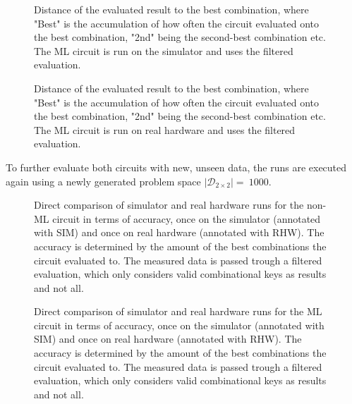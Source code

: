 \begin{figure}[!h]
    \centering
    \scalebox{\resultboxplot}{
        
    }
    \caption{Distance of the evaluated result to the best combination, where "Best" is the accumulation of how often the circuit evaluated onto the best combination, "2nd" being the second-best combination etc. The ML circuit is run on the simulator and uses the filtered evaluation.}
    \label{figure:ml_sim_distance}
\end{figure}



\begin{figure}[!h]
    \centering
    \scalebox{\resultboxplot}{
        
    }
    \caption{Distance of the evaluated result to the best combination, where "Best" is the accumulation of how often the circuit evaluated onto the best combination, "2nd" being the second-best combination etc. The ML circuit is run on real hardware and uses the filtered evaluation.}
    \label{figure:ml_rhw_dist}
\end{figure}

\clearpage

To further evaluate both circuits with new, unseen data, the runs are executed again using a newly generated problem space $\left|\mathcal{D}_{2\times2}\right| =\ 1000$.

\begin{figure}[!h]
    \centering
    \scalebox{\resultboxplot}{
        
    }
    \caption{Direct comparison of simulator and real hardware runs for the non-ML circuit in terms of accuracy, once on the simulator (annotated with SIM) and once on real hardware (annotated with RHW). The accuracy is determined by the amount of the best combinations the circuit evaluated to. The measured data is passed trough a filtered evaluation, which only considers valid combinational keys as results and not all.}
    \label{figure:blind_run_noml_circuit_acc}
\end{figure}

\begin{figure}[!h]
    \centering
    \scalebox{\resultboxplot}{
        
    }
    \caption{Direct comparison of simulator and real hardware runs for the ML circuit in terms of accuracy, once on the simulator (annotated with SIM) and once on real hardware (annotated with RHW). The accuracy is determined by the amount of the best combinations the circuit evaluated to. The measured data is passed trough a filtered evaluation, which only considers valid combinational keys as results and not all.}
    \label{figure:blind_run_ml_circuit_f_acc}
\end{figure}

